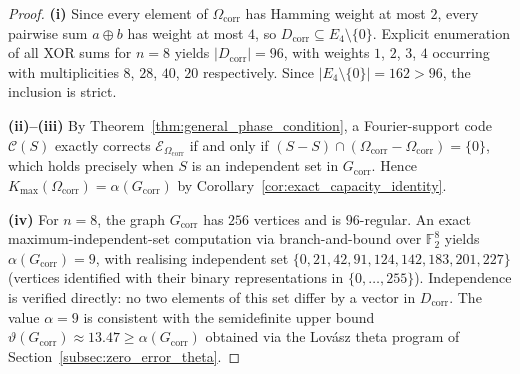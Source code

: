 \documentclass[a4paper,twocolumn,11pt,allowtoday]{quantumarticle}
\theoremstyle{plain}
\theoremstyle{definition}
\theoremstyle{remark}
\begin{document}
\begin{proof}
\textbf{(i)}
Since every element of $\Omega_{\mathrm{corr}}$ has Hamming weight
at most $2$, every pairwise sum $a \oplus b$ has weight at most $4$,
so $D_{\mathrm{corr}} \subseteq E_4 \setminus \{0\}$.
Explicit enumeration of all XOR sums for $n = 8$ yields
$|D_{\mathrm{corr}}| = 96$, with weights $1$, $2$, $3$, $4$
occurring with multiplicities $8$, $28$, $40$, $20$ respectively.
Since $|E_4 \setminus \{0\}| = 162 > 96$, the inclusion is strict.

\textbf{(ii)--(iii)}
By Theorem~\ref{thm:general_phase_condition}, a Fourier-support
code $\mathcal{C}(S)$ exactly corrects $\mathcal{E}_{\Omega_{\mathrm{corr}}}$
if and only if
$(S - S) \cap (\Omega_{\mathrm{corr}} - \Omega_{\mathrm{corr}}) = \{0\}$,
which holds precisely when $S$ is an independent set in
$G_{\mathrm{corr}}$.
Hence $K_{\max}(\Omega_{\mathrm{corr}}) = \alpha(G_{\mathrm{corr}})$
by Corollary~\ref{cor:exact_capacity_identity}.

\textbf{(iv)}
For $n = 8$, the graph $G_{\mathrm{corr}}$ has $256$ vertices and is
$96$-regular. An exact maximum-independent-set computation via
branch-and-bound over $\mathbb{F}_2^8$ yields
$\alpha(G_{\mathrm{corr}}) = 9$,
with realising independent set
$\{0, 21, 42, 91, 124, 142, 183, 201, 227\}$
(vertices identified with their binary representations in
$\{0,\ldots,255\}$).
Independence is verified directly: no two elements of this set
differ by a vector in $D_{\mathrm{corr}}$.
The value $\alpha = 9$ is consistent with the semidefinite upper
bound $\vartheta(G_{\mathrm{corr}}) \approx 13.47 \ge \alpha(G_{\mathrm{corr}})$
obtained via the Lov\'{a}sz theta program of
Section~\ref{subsec:zero_error_theta}.
\end{proof}
\end{document}
